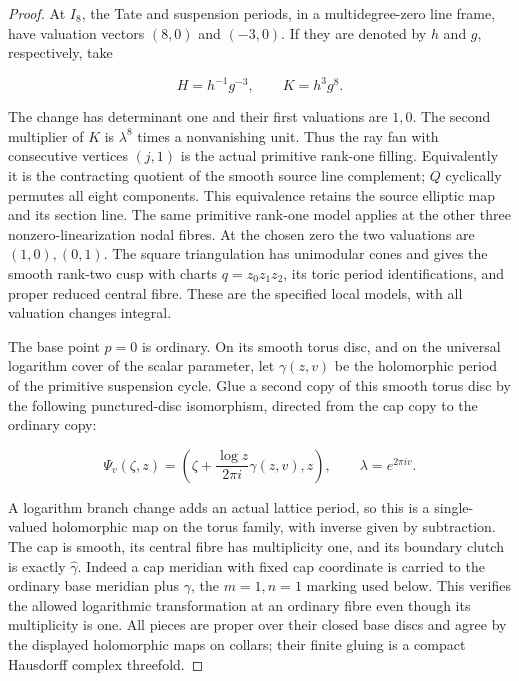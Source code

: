 \begin{proof}
At \(I_8\), the Tate and suspension periods, in a multidegree-zero
line frame, have valuation vectors \((8,0)\) and \((-3,0)\).
If they are denoted by \(h\) and \(g\), respectively, take

\[
 H=h^{-1}g^{-3},\qquad K=h^3g^8.
\]

The change has determinant one and their first valuations are
\(1,0\).  The second multiplier of \(K\) is \(\lambda^8\)
times a nonvanishing unit.  Thus the ray fan with consecutive
vertices \((j,1)\) is the actual primitive rank-one filling.
Equivalently it is the contracting quotient of the smooth source
line complement; \(Q\) cyclically permutes all eight components.
This equivalence retains the source elliptic map and its section
line.  The same primitive rank-one model applies at the other
three nonzero-linearization nodal fibres.  At the chosen zero
the two valuations are \((1,0),(0,1)\).  The square triangulation
has unimodular cones and gives the smooth rank-two cusp with
charts \(q=z_0z_1z_2\), its toric period identifications, and
proper reduced central fibre.  These are the specified local
models, with all valuation changes integral.

The base point \(p=0\) is ordinary.  On its smooth torus disc,
and on the universal logarithm cover of the scalar parameter,
let \(\gamma(z,v)\) be the holomorphic period of the primitive
suspension cycle. Glue a second copy of this smooth torus disc
by the following punctured-disc isomorphism, directed from the
cap copy to the ordinary copy:

\[
 \Psi_v(\zeta,z)=
 \left(\zeta+\frac{\log z}{2\pi i}\gamma(z,v),z\right),
 \qquad \lambda=e^{2\pi i v}.
\]

A logarithm branch change adds an actual lattice period, so this
is a single-valued holomorphic map on the torus family, with
inverse given by subtraction.  The cap is smooth, its central
fibre has multiplicity one, and its boundary clutch is exactly
\(\widehat\gamma\). Indeed a cap meridian with fixed cap coordinate
is carried to the ordinary base meridian plus \(\gamma\), the
\(m=1,n=1\) marking used below. This verifies the allowed logarithmic
transformation at an ordinary fibre even though its multiplicity
is one.  All pieces are proper over their closed base discs and
agree by the displayed holomorphic maps on collars; their finite
gluing is a compact Hausdorff complex threefold.


\end{proof}
